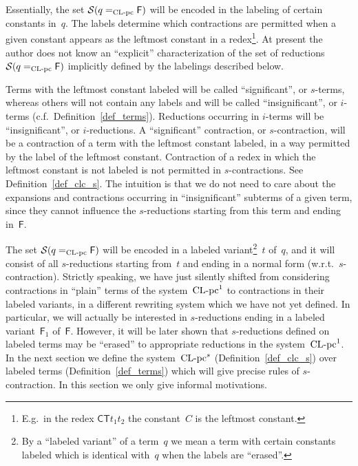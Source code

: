 \documentclass[a4paper,UKenglish]{lipics-v2016}
\newcommand{\Cs}{\mathsf{C}}
\newcommand{\Fs}{\mathsf{F}}
\newcommand{\Ts}{\mathsf{T}}
\newcommand{\Sc}{\ensuremath{{\mathcal S}}}
\newcommand{\CLC}{{\mbox{${\text{\rm CL-pc}^1}$}}}
\newcommand{\sCLCz}{\ensuremath{\text{\rm CL-pc}}}
\newcommand{\CLCs}{{\mbox{${\text{\rm CL-pc}^s}$}}}
\begin{document}
Essentially, the set $\Sc(q =_\sCLCz \Fs)$ will be encoded in the
labeling of certain constants in~$q$. The labels determine which
contractions are permitted when a given constant appears as the
leftmost constant in a redex\footnote{E.g.~in the redex
  $\Cs \Ts t_1 t_2$ the constant~$C$ is the leftmost constant.}. At
present the author does not know an ``explicit'' characterization of
the set of reductions $\Sc(q =_\sCLCz \Fs)$ implicitly defined by the
labelings described below.

Terms with the leftmost constant labeled will be called
``significant'', or $s$-terms, whereas others will not contain any
labels and will be called ``insignificant'', or $i$-terms
(c.f.~Definition~\ref{def_terms}). Reductions occurring in $i$-terms
will be ``insignificant'', or $i$-reductions. A ``significant''
contraction, or $s$-contraction, will be a contraction of a term with
the leftmost constant labeled, in a way permitted by the label of the
leftmost constant. Contraction of a redex in which the leftmost
constant is not labeled is not permitted in $s$-contractions. See
Definition~\ref{def_clc_s}. The intuition is that we do not need to
care about the expansions and contractions occurring in
``insignificant'' subterms of a given term, since they cannot
influence the $s$-reductions starting from this term and ending
in~$\Fs$.

The set $\Sc(q =_{\sCLCz} \Fs)$ will be encoded in a labeled
variant\footnote{By a ``labeled variant'' of a term~$q$ we mean a term
  with certain constants labeled which is identical with~$q$ when the
  labels are ``erased''.}~$t$ of~$q$, and it will consist of all
$s$-reductions starting from~$t$ and ending in a normal form
(w.r.t.~$s$-contraction). Strictly speaking, we have just silently
shifted from considering contractions in ``plain'' terms of the
system~$\CLC$ to contractions in their labeled variants, in a
different rewriting system which we have not yet defined. In
particular, we will actually be interested in $s$-reductions ending in
a labeled variant~$\Fs_1$ of~$\Fs$. However, it will be later shown
that $s$-reductions defined on labeled terms may be ``erased'' to
appropriate reductions in the system~$\CLC$. In the next section we
define the system~$\CLCs$ (Definition~\ref{def_clc_s}) over labeled
terms (Definition~\ref{def_terms}) which will give precise rules of
$s$-contraction. In this section we only give informal motivations.
\end{document}
